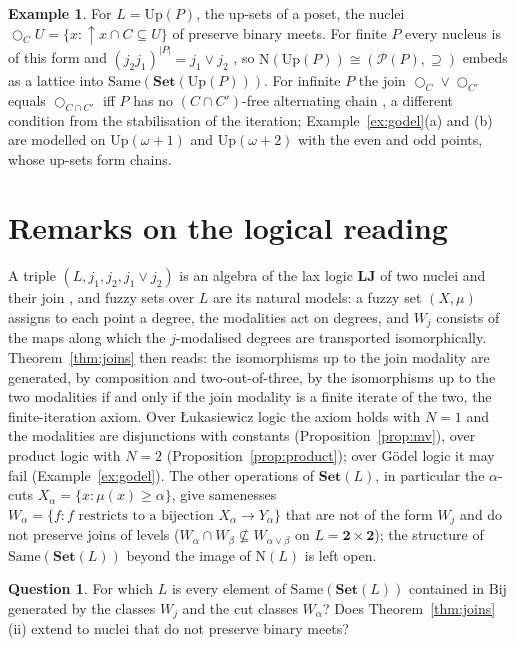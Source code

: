 \documentclass[11pt]{amsart}
\theoremstyle{definition}
\newtheorem{ex}[thm]{Example}
\newtheorem{que}[thm]{Question}
\newcommand{\Up}{\mathrm{Up}}
\newcommand{\Nuc}{\mathrm{N}}
\newcommand{\Same}{\mathrm{Same}}
\newcommand{\FSet}{\mathbf{Set}}
\newcommand{\Bij}{\mathrm{Bij}}
\newcommand{\LLJ}{\mathbf{LJ}}
\newcommand{\lax}{\bigcirc}
\begin{document}
\begin{ex}
For $L=\Up(P)$, the up-sets of a poset, the nuclei $\lax_CU=\{x:\uparrow\!x
\cap C\subseteq U\}$ of \cite{Laxjoin,Relnec} preserve binary meets. For
finite $P$ every nucleus is of this form and $(j_2j_1)^{|P|}=j_1\vee j_2$
\cite[Thm.~4.1]{Laxjoin}, so $\Nuc(\Up(P))\cong(\mathcal P(P),\supseteq)$
embeds as a lattice into $\Same(\FSet(\Up(P)))$. For infinite $P$ the join
$\lax_C\vee\lax_{C'}$ equals $\lax_{C\cap C'}$ iff $P$ has no $(C\cap C')$-free
alternating chain \cite{Relnec}, a different condition from the
stabilisation of the iteration; Example~\ref{ex:godel}(a) and (b) are modelled on
$\Up(\omega+1)$ and $\Up(\omega+2)$ with the even and odd points, whose
up-sets form chains.
\end{ex}

\section{Remarks on the logical reading}\label{sec:logic}

A triple $(L,j_1,j_2,j_1\vee j_2)$ is an algebra of the lax logic $\LLJ$
of two nuclei and their join \cite{Laxjoin}, and fuzzy sets over $L$ are its
natural models: a fuzzy set $(X,\mu)$ assigns to each point a degree, the
modalities act on degrees, and $W_j$ consists of the maps along which the
$j$-modalised degrees are transported isomorphically. Theorem~\ref{thm:joins}
then reads: the isomorphisms up to the join modality are generated, by
composition and two-out-of-three, by the isomorphisms up to the two
modalities if and only if the join modality is a finite iterate of the two,
the finite-iteration axiom. Over \L ukasiewicz logic the axiom holds with
$N=1$ and the modalities are disjunctions with constants
(Proposition~\ref{prop:mv}), over product logic with $N=2$
(Proposition~\ref{prop:product}); over G\"odel logic it may fail
(Example~\ref{ex:godel}). The other operations of $\FSet(L)$, in particular
the $\alpha$-cuts $X_\alpha=\{x:\mu(x)\ge\alpha\}$, give samenesses
$W_\alpha=\{f:f\text{ restricts to a bijection }X_\alpha\to Y_\alpha\}$ that
are not of the form $W_j$ and do not preserve joins of levels
($W_\alpha\cap W_\beta\not\subseteq W_{\alpha\vee\beta}$ on $L=\mathbf 2\times
\mathbf 2$); the structure of $\Same(\FSet(L))$ beyond the image of
$\Nuc(L)$ is left open.

\begin{que}
For which $L$ is every element of $\Same(\FSet(L))$ contained in $\Bij$
generated by the classes $W_j$ and the cut classes $W_\alpha$? Does
Theorem~\ref{thm:joins}(ii) extend to nuclei that do not preserve binary
meets?
\end{que}
\end{document}
